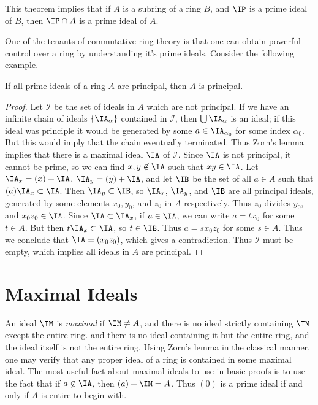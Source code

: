 \begin{remark}
    This theorem implies that if $A$ is a subring of a ring $B$, and $\IP$ is a prime ideal of $B$, then $\IP \cap A$ is a prime ideal of $A$.
\end{remark}

One of the tenants of commutative ring theory is that one can obtain powerful control over a ring by understanding it's prime ideals. Consider the following example.

\begin{theorem}
    If all prime ideals of a ring $A$ are principal, then $A$ is principal.
\end{theorem}
\begin{proof}
    Let $\mathcal{I}$ be the set of ideals in $A$ which are not principal. If we have an infinite chain of ideals $\{ \IA_\alpha \}$ contained in $\mathcal{I}$, then $\bigcup \IA_\alpha$ is an ideal; if this ideal was principle it would be generated by some $a \in \IA_{\alpha_0}$ for some index $\alpha_0$. But this would imply that the chain eventually terminated. Thus Zorn's lemma implies that there is a maximal ideal $\IA$ of $\mathcal{I}$. Since $\IA$ is not principal, it cannot be prime, so we can find $x,y \not \in \IA$ such that $xy \in \IA$. Let $\IA_x = (x) + \IA$, $\IA_y = (y) + \IA$, and let $\IB$ be the set of all $a \in A$ such that $(a) \IA_x \subset \IA$. Then $\IA_y \subset \IB$, so $\IA_x$, $\IA_y$, and $\IB$ are all principal ideals, generated by some elements $x_0,y_0$, and $z_0$ in $A$ respectively. Thus $z_0$ divides $y_0$, and $x_0z_0 \in \IA$. Since $\IA \subset \IA_x$, if $a \in \IA$, we can write $a = tx_0$ for some $t \in A$. But then $t\IA_x \subset \IA$, so $t \in \IB$. Thus $a = sx_0z_0$ for some $s \in A$. Thus we conclude that $\IA = (x_0z_0)$, which gives a contradiction. Thus $\mathcal{I}$ must be empty, which implies all ideals in $A$ are principal.
\end{proof}

\section{Maximal Ideals}

An ideal $\IM$ is \emph{maximal} if $\IM \neq A$, and there is no ideal strictly containing $\IM$ except the entire ring. and there is no ideal containing it but the entire ring, and the ideal itself is not the entire ring. Using Zorn's lemma in the classical manner, one may verify that any proper ideal of a ring is contained in some maximal ideal. The most useful fact about maximal ideals to use in basic proofs is to use the fact that if $a \not \in \IA$, then $(a) + \IM = A$. Thus $(0)$ is a prime ideal if and only if $A$ is entire to begin with.

